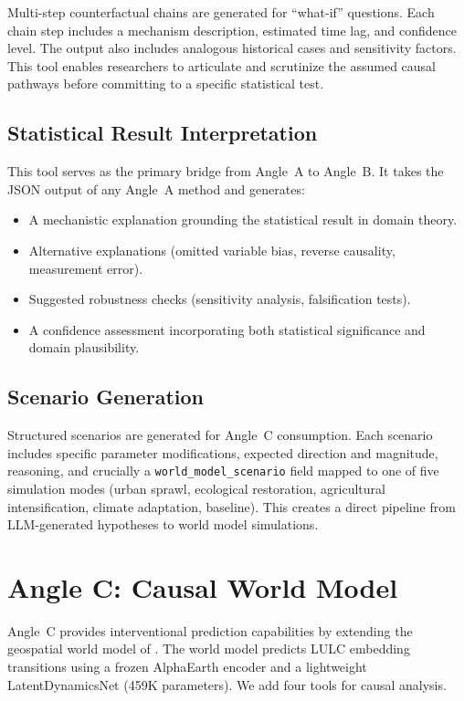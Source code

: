 \documentclass{article}
\begin{document}
Multi-step counterfactual chains are generated for ``what-if'' questions. Each chain step includes a mechanism description, estimated time lag, and confidence level. The output also includes analogous historical cases and sensitivity factors. This tool enables researchers to articulate and scrutinize the assumed causal pathways before committing to a specific statistical test.

\subsection{Statistical Result Interpretation}

This tool serves as the primary bridge from Angle~A to Angle~B. It takes the JSON output of any Angle~A method and generates:
\begin{itemize}
\item A mechanistic explanation grounding the statistical result in domain theory.
\item Alternative explanations (omitted variable bias, reverse causality, measurement error).
\item Suggested robustness checks (sensitivity analysis, falsification tests).
\item A confidence assessment incorporating both statistical significance and domain plausibility.
\end{itemize}

\subsection{Scenario Generation}

Structured scenarios are generated for Angle~C consumption. Each scenario includes specific parameter modifications, expected direction and magnitude, reasoning, and crucially a \texttt{world\_model\_scenario} field mapped to one of five simulation modes (urban sprawl, ecological restoration, agricultural intensification, climate adaptation, baseline). This creates a direct pipeline from LLM-generated hypotheses to world model simulations.


\section{Angle C: Causal World Model}
\label{sec:angle_c}

Angle~C provides interventional prediction capabilities by extending the geospatial world model of \citet{zhou2026worldmodel}. The world model predicts LULC embedding transitions using a frozen AlphaEarth encoder and a lightweight LatentDynamicsNet (459K parameters). We add four tools for causal analysis.
\end{document}

